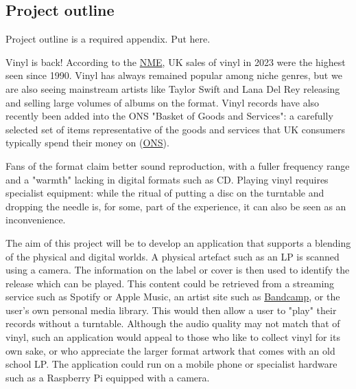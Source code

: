     \begin{uomappendix} 
        \section{Project outline}
    
            \begin{temp}
                Project outline is a required appendix. Put here.
            \end{temp}
            
            Vinyl is back! According to the \href{https://www.nme.com/news/music/uk-vinyl-sales-2023-reach-highest-level-since-1990-3563676}{NME}, UK sales of vinyl in 2023 were the highest seen since 1990. Vinyl has always remained popular among niche genres, but we are also seeing mainstream artists like Taylor Swift and Lana Del Rey releasing and selling large volumes of albums on the format. Vinyl records have also recently been added into the ONS "Basket of Goods and Services": a carefully selected set of items representative of the goods and services that UK consumers typically spend their money on (\href{https://www.ons.gov.uk/news/news/arecordrevivalthatscookingupastormvinylmusicandairfryersspintheirwayintothebasketofgoods}{ONS}).
            
            Fans of the format claim better sound reproduction, with a fuller frequency range and a "warmth" lacking in digital formats such as CD. Playing vinyl requires specialist equipment: while the ritual of putting a disc on the turntable and dropping the needle is, for some, part of the experience, it can also be seen as an inconvenience.
            
            The aim of this project will be to develop an application that supports a blending of the physical and digital worlds. A physical artefact such as an LP is scanned using a camera. The information on the label or cover is then used to identify the release which can be played. This content could be retrieved from a streaming service such as Spotify or Apple Music, an artist site such as \href{https://bandcamp.com/}{Bandcamp}, or the user's own personal media library. This would then allow a user to "play" their records without a turntable. Although the audio quality may not match that of vinyl, such an application would appeal to those who like to collect vinyl for its own sake, or who appreciate the larger format artwork that comes with an old school LP. The application could run on a mobile phone or specialist hardware such as a Raspberry Pi equipped with a camera.
            

\end{uomappendix}
